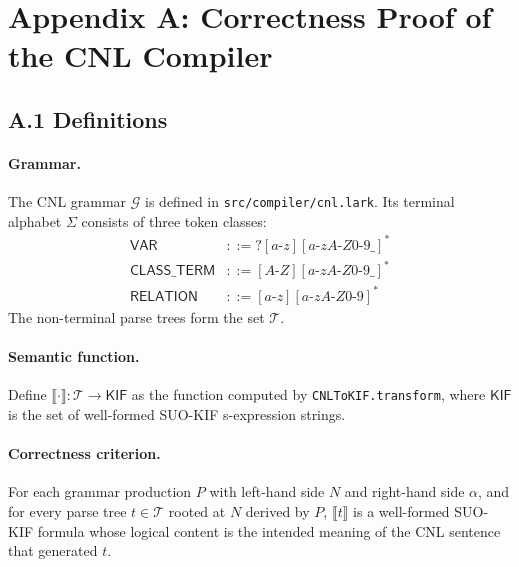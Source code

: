 
\section*{Appendix A: Correctness Proof of the CNL Compiler}

\subsection*{A.1 Definitions}

\paragraph{Grammar.}
The CNL grammar $\mathcal{G}$ is defined in \texttt{src/compiler/cnl.lark}.
Its terminal alphabet $\Sigma$ consists of three token classes:
\begin{align*}
  \mathsf{VAR}        &::= \texttt{?}[a\text{-}z][a\text{-}zA\text{-}Z0\text{-}9\_]^* \\
  \mathsf{CLASS\_TERM}&::= [A\text{-}Z][a\text{-}zA\text{-}Z0\text{-}9\_]^* \\
  \mathsf{RELATION}   &::= [a\text{-}z][a\text{-}zA\text{-}Z0\text{-}9]^*
\end{align*}
The non-terminal parse trees form the set $\mathcal{T}$.

\paragraph{Semantic function.}
Define $\llbracket \cdot \rrbracket : \mathcal{T} \to \mathsf{KIF}$ as the function computed by
\texttt{CNLToKIF.transform}, where $\mathsf{KIF}$ is the set of well-formed SUO-KIF
s-expression strings.

\paragraph{Correctness criterion.}
For each grammar production $P$ with left-hand side $N$ and right-hand side $\alpha$,
and for every parse tree $t \in \mathcal{T}$ rooted at $N$ derived by $P$,
$\llbracket t \rrbracket$ is a well-formed SUO-KIF formula whose logical content is the
intended meaning of the CNL sentence that generated $t$.

